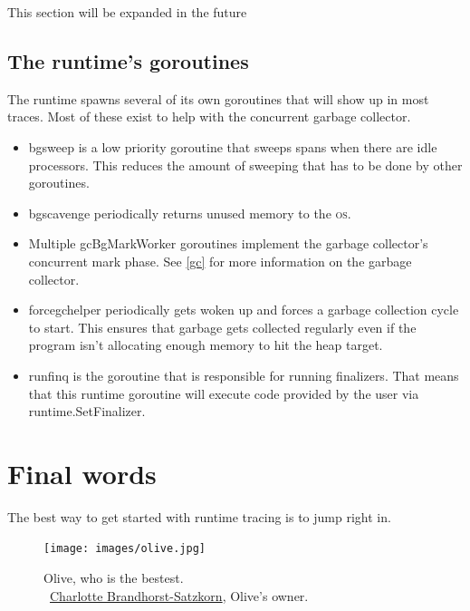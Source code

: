 \documentclass[10pt,letterpaper,oneside,openany,english]{memoir}
\newcommand{\code}[1]{{\ttfamily\mbox{#1}}}
\newcommand{\todo}[1]{{\color{red}#1}}
\begin{document}

\todo{This section will be expanded in the future}

\section{The runtime's goroutines}
The runtime spawns several of its own goroutines that will show up in most traces.
Most of these exist to help with the concurrent garbage collector.

\begin{itemize}
\item \code{bgsweep} is a low priority goroutine that sweeps spans when there are idle processors. This reduces the amount
  of sweeping that has to be done by other goroutines.
\item \code{bgscavenge} periodically returns unused memory to the \textsc{os}.
\item Multiple \code{gcBgMarkWorker} goroutines implement the garbage collector's concurrent mark phase. See \cref{gc} for more information on the garbage collector.
\item \code{forcegchelper} periodically gets woken up and forces a garbage collection cycle to start.
  This ensures that garbage gets collected regularly even if the program isn't allocating enough memory to hit the heap target.
\item \code{runfinq} is the goroutine that is responsible for running finalizers.
  That means that this runtime goroutine will execute code provided by the user via \code{runtime.SetFinalizer}.
\end{itemize}

\chapter{Final words}

The best way to get started with runtime tracing is to jump right in.
\enlargethispage{3\baselineskip}
\begin{figure}[h!]
  \centering
  \texttt{[image: images/olive.jpg]}
  \caption*{Olive, who is the bestest.\\\textcopyright{}~\href{https://catzkorn.dev/}{Charlotte Brandhorst-Satzkorn}, Olive's owner.}
\end{figure}


\backmatter

\printbibliography
\end{document}
